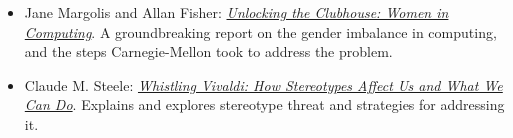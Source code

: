 \begin{itemize}
\item
  Jane Margolis and Allan Fisher:
\emph{\href{http://www.amazon.com/Unlocking-Clubhouse-Computing-Jane-Margolis/dp/0262632691/}{Unlocking
the Clubhouse: Women in Computing}}.
A groundbreaking report on the gender imbalance in computing, and the
steps Carnegie-Mellon took to address the problem.

\item
  Claude M. Steele:
\emph{\href{http://www.amazon.com/Whistling-Vivaldi-Stereotypes-Affect-Issues/dp/0393339726/}{Whistling
Vivaldi: How Stereotypes Affect Us and What We Can Do}}.
Explains and explores stereotype threat and strategies for addressing
it.

\end{itemize}


